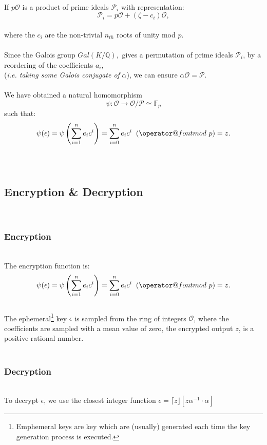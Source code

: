 \documentclass[10pt]{article}
\makeatletter
\def\imod#1{\allowbreak\mkern10mu({\operator@font mod}\,\,#1)}
\makeatother
\begin{document}
\\
\begin{tcolorbox}
If $p\mathcal{O}$ is a product of prime ideals $\mathcal{P}_{i}$ with representation: \\ 
$$\mathcal{P}_{i} = p\mathcal{O} + (\zeta-c_{i}) \mathcal{O},$$ 
\\ where the $c_{i}$ are the non-trivial $n_{th}$ roots of unity mod $p$. 
\\ \\ 
Since the Galois group $Gal(K/\mathbb{Q}),$ gives a permutation of prime ideals $\mathcal{P}_{i}$, by a reordering of the coefficients $a_{i}$, 
\\
(\textit{i.e. taking some Galois conjugate of} $\mathit{\alpha}$), we can ensure $ \alpha \mathcal{O} = \mathcal{P} $. 
\\ \\
We have obtained a natural homomorphism \\ $$\psi : \mathcal{O} \rightarrow \mathcal{O}/\mathcal{P} \simeq \mathbb{F}_{p}$$ such that: 
\\
$$ \psi(\epsilon) = \psi \left( \sum_{i=1}^{n}e_{i}c^{i} \right) = \sum_{i=0}^{n} e_{i}c^{i}\imod{p}=z. $$
\\ \\ 

\subsection{Encryption \& Decryption}
\\
\subsubsection{Encryption}
\\
The encryption function is:
$$ \psi(\epsilon) = \psi \left( \sum_{i=1}^{n}e_{i}c^{i} \right) = \sum_{i=0}^{n} e_{i}c^{i}\imod{p}=z. $$
\\
The ephemeral\footnote{Emphemeral keys are key which are (usually)  generated each time the key generation process is executed. } key $\epsilon$ is sampled from the ring of integers $\mathcal{O}$, where the coefficients are sampled with a mean value of zero, the encrypted output $z$, is a positive rational number.
\\ \\
\subsubsection{Decryption}
\\
To decrypt $\epsilon$, we use the closest integer function $\epsilon = \lceil z \rfloor [z\alpha^{-1}\cdot \alpha]$
\end{tcolorbox}
\end{document}
